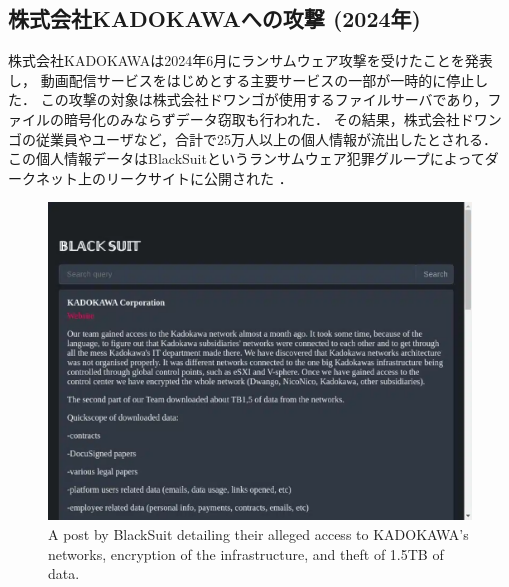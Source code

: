 \subsection{株式会社KADOKAWAへの攻撃 (2024年)}
株式会社KADOKAWAは2024年6月にランサムウェア攻撃を受けたことを発表し，
動画配信サービスをはじめとする主要サービスの一部が一時的に停止した\cite{kadokawa-apology}．
この攻撃の対象は株式会社ドワンゴが使用するファイルサーバであり，ファイルの暗号化のみならずデータ窃取も行われた．
その結果，株式会社ドワンゴの従業員やユーザなど，合計で25万人以上の個人情報が流出したとされる．
この個人情報データはBlackSuitというランサムウェア犯罪グループによってダークネット上のリークサイトに公開された \cite{kadokawa-leak-PPI}．
\begin{figure}[t]
  \begin{center}
    \includegraphics[width=0.8\columnwidth]{doc/img/BlackSuit-2024-06-27-060714.eps}
  \end{center}
  \caption{A post by BlackSuit detailing their alleged access to KADOKAWA’s networks, encryption of the infrastructure,
    and theft of 1.5TB of data. \cite{kadokawa-leak-PPI}}
  \label{fig:kadokawa-leak}
\end{figure}

